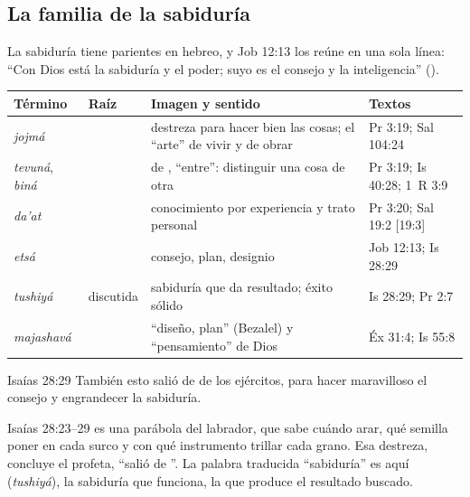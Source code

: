 
\subsection{La familia de la sabiduría}

La sabiduría tiene parientes en hebreo, y Job 12:13 los reúne en una sola línea: ``Con Dios está la sabiduría y el poder; suyo es el consejo y la inteligencia'' ().

\begin{center}\small\renewcommand{\arraystretch}{1.25}
\begin{tabular}{@{}L{3.0cm}L{1.4cm}L{6.0cm}L{4.0cm}@{}}
\toprule
\textbf{Término} & \textbf{Raíz} & \textbf{Imagen y sentido} & \textbf{Textos} \\ \midrule
{} \emph{jojmá} &  & destreza para hacer bien las cosas; el ``arte'' de vivir y de obrar & Pr 3:19; Sal 104:24 \\
 \emph{tevuná},  \emph{biná} &  & de , ``entre'': distinguir una cosa de otra & Pr 3:19; Is 40:28; 1~R 3:9 \\
 \emph{da'at} &  & conocimiento por experiencia y trato personal & Pr 3:20; Sal 19:2 [19:3] \\
 \emph{etsá} &  & consejo, plan, designio & Job 12:13; Is 28:29 \\
 \emph{tushiyá} & discutida & sabiduría que da resultado; éxito sólido & Is 28:29; Pr 2:7 \\
 \emph{majashavá} &  & ``diseño, plan'' (Bezalel) y ``pensamiento'' de Dios & Éx 31:4; Is 55:8 \\
\bottomrule
\end{tabular}\end{center}

\begin{verso}{Isaías 28:29}
También esto salió de \SENOR{} de los ejércitos, para hacer maravilloso el consejo y engrandecer la sabiduría.
\end{verso}

Isaías 28:23--29 es una parábola del labrador, que sabe cuándo arar, qué semilla poner en cada surco y con qué instrumento trillar cada grano. Esa destreza, concluye el profeta, ``salió de \SENOR''. La palabra traducida ``sabiduría'' es aquí  (\emph{tushiyá}), la sabiduría que funciona, la que produce el resultado buscado.

